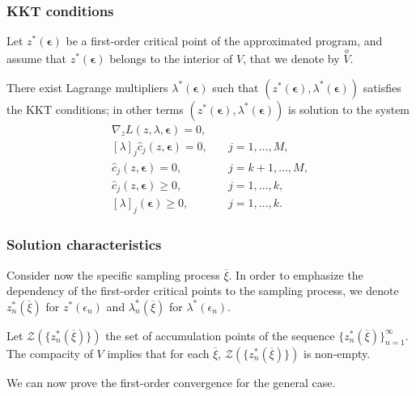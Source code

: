 \documentclass{beamer}
\def\bepsilon{\boldsymbol\epsilon}
\begin{document}
\begin{frame}
\frametitle{KKT conditions}

Let $z^*(\bepsilon)$ be a first-order critical point of the approximated program, and assume that $z^*(\bepsilon)$ belongs to the interior of $V$, that we denote by $\overset{o}{V}$.

\mbox{}

There exist Lagrange multipliers $\lambda^*(\boldsymbol{\epsilon})$ such that $(z^*(\boldsymbol{\epsilon}), \lambda^*(\boldsymbol{\epsilon}))$ satisfies the KKT conditions; in other terms $(z^*(\boldsymbol{\epsilon}), \lambda^*(\boldsymbol{\epsilon}))$ is solution to the system
\[
\begin{aligned}
\nabla_z L(z, \lambda, \boldsymbol{\epsilon}) = 0,\\
[\lambda]_j\hat{c}_j(z, \boldsymbol{\epsilon}) = 0, &\quad j = 1,\ldots,M,\\
\hat{c}_j(z, \boldsymbol{\epsilon}) = 0, &\quad j = k+1,\ldots,M,\\
\hat{c}_j(z, \boldsymbol{\epsilon}) \geq 0, &\quad j = 1,\ldots,k,\\
[\lambda]_j(\boldsymbol{\epsilon}) \geq 0, &\quad j = 1,\ldots,k.
\end{aligned}
\]

\end{frame}

\begin{frame}
\frametitle{Solution characteristics}

Consider now the specific sampling process $\overline{\xi}$.
In order to emphasize the dependency of the first-order critical points to the sampling process, we denote $z_n^*(\overline{\xi})$ for $z^*(\epsilon_n)$ and $\lambda_n^*(\overline{\xi})$ for $\lambda^*(\epsilon_n)$.

\mbox{}

Let $\mathcal{Z}\left(\lbrace z^*_n(\overline{\xi})\rbrace\right)$ the set of accumulation points of the sequence $\lbrace z_n^*(\overline{\xi}) \rbrace_{n = 1}^{\infty}$.
The compacity of $V$ implies that for each $\overline{\xi}$, %
$\mathcal{Z}\left(\lbrace z^*_n(\overline{\xi})\rbrace\right)$ is non-empty.

\mbox{}

We can now prove the first-order convergence for the general case.

\end{frame}
\end{document}
